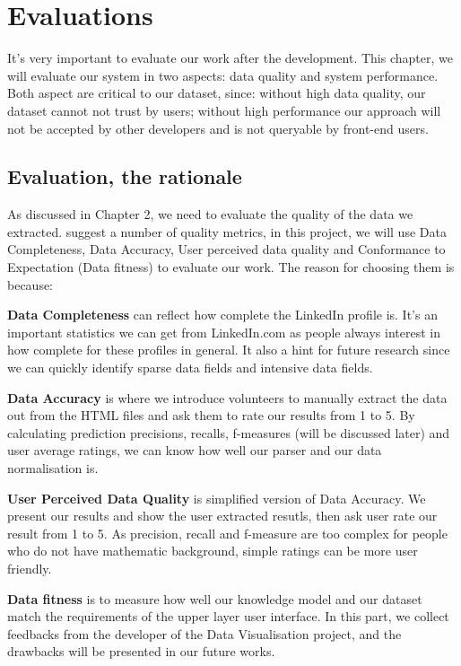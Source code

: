 \chapter{Evaluations}\label{chap:eval}
It's very important to evaluate our work after the development. This chapter, we will evaluate our system in two aspects: data quality and system performance. Both aspect are critical to our dataset, since: without high data quality, our dataset cannot not trust by users; without high performance our approach will not be accepted by other developers and is not queryable by front-end users.

\newcommand{\round}[1]{\DTLround{#1}{#1}{4}#1}

\section{Evaluation, the rationale}

As discussed in Chapter 2, we need to evaluate the quality of the data we extracted. \cite{ochoa2006} suggest a number of quality metrics, in this project, we will use Data Completeness, Data Accuracy, User perceived data quality and Conformance to Expectation (Data fitness) to evaluate our work. The reason for choosing them is because: 

\begin{description}
	\item \textbf{Data Completeness} can reflect how complete the LinkedIn profile is. It's an important statistics we can get from LinkedIn.com as people always interest in how complete for these profiles in general. It also a hint for future research since we can quickly identify sparse data fields and intensive data fields.
	\item \textbf{Data Accuracy} is where we introduce volunteers to manually extract the data out from the HTML files and ask them to rate our results from 1 to 5. By calculating prediction precisions, recalls, f-measures (will be discussed later) and user average ratings, we can know how well our parser and our data normalisation is.
	\item \textbf{User Perceived Data Quality} is simplified version of Data Accuracy. We present our results and show the user extracted resutls, then ask user rate our result from 1 to 5. As precision, recall and f-measure are too complex for people who do not have mathematic background, simple ratings can be more user friendly.
	\item \textbf{Data fitness} is to measure how well our knowledge model and our dataset match the requirements of the upper layer user interface. In this part, we collect feedbacks from the developer of the Data Visualisation project, and the drawbacks will be presented in our future works.
\end{description}

